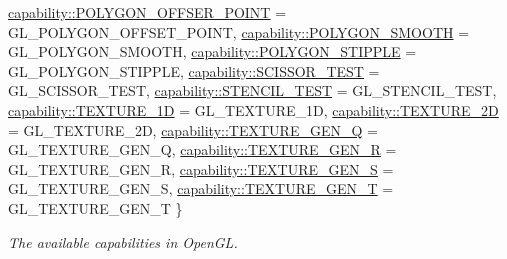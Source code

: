 \begin{DoxyCompactItemize}
\hyperlink{namespaceglpp_a1b0f7d2f17d11ae11a12d44571612832a812ddadddce589442acb4d1166558c55}{capability\+::\+P\+O\+L\+Y\+G\+O\+N\+\_\+\+O\+F\+F\+S\+E\+R\+\_\+\+P\+O\+I\+NT} = G\+L\+\_\+\+P\+O\+L\+Y\+G\+O\+N\+\_\+\+O\+F\+F\+S\+E\+T\+\_\+\+P\+O\+I\+NT, 
\hyperlink{namespaceglpp_a1b0f7d2f17d11ae11a12d44571612832ab48780489ecd89e7f6b5012516ab113e}{capability\+::\+P\+O\+L\+Y\+G\+O\+N\+\_\+\+S\+M\+O\+O\+TH} = G\+L\+\_\+\+P\+O\+L\+Y\+G\+O\+N\+\_\+\+S\+M\+O\+O\+TH, 
\hyperlink{namespaceglpp_a1b0f7d2f17d11ae11a12d44571612832ad5157f73a39d9fe47a87911957b6be34}{capability\+::\+P\+O\+L\+Y\+G\+O\+N\+\_\+\+S\+T\+I\+P\+P\+LE} = G\+L\+\_\+\+P\+O\+L\+Y\+G\+O\+N\+\_\+\+S\+T\+I\+P\+P\+LE, 
\newline
\hyperlink{namespaceglpp_a1b0f7d2f17d11ae11a12d44571612832aa527bbbc7b629e468522e5d74350c1f5}{capability\+::\+S\+C\+I\+S\+S\+O\+R\+\_\+\+T\+E\+ST} = G\+L\+\_\+\+S\+C\+I\+S\+S\+O\+R\+\_\+\+T\+E\+ST, 
\hyperlink{namespaceglpp_a1b0f7d2f17d11ae11a12d44571612832aeb0a53c0c3e59812922cab45a05ae24e}{capability\+::\+S\+T\+E\+N\+C\+I\+L\+\_\+\+T\+E\+ST} = G\+L\+\_\+\+S\+T\+E\+N\+C\+I\+L\+\_\+\+T\+E\+ST, 
\hyperlink{namespaceglpp_a1b0f7d2f17d11ae11a12d44571612832a85975f3555d8eb49414ceb23f293b0e3}{capability\+::\+T\+E\+X\+T\+U\+R\+E\+\_\+1D} = G\+L\+\_\+\+T\+E\+X\+T\+U\+R\+E\+\_\+1D, 
\hyperlink{namespaceglpp_a1b0f7d2f17d11ae11a12d44571612832acc301ce75e16247f3b96a3907519096c}{capability\+::\+T\+E\+X\+T\+U\+R\+E\+\_\+2D} = G\+L\+\_\+\+T\+E\+X\+T\+U\+R\+E\+\_\+2D, 
\newline
\hyperlink{namespaceglpp_a1b0f7d2f17d11ae11a12d44571612832a811f5a9cc14c1614ce93781ba6fc5351}{capability\+::\+T\+E\+X\+T\+U\+R\+E\+\_\+\+G\+E\+N\+\_\+Q} = G\+L\+\_\+\+T\+E\+X\+T\+U\+R\+E\+\_\+\+G\+E\+N\+\_\+Q, 
\hyperlink{namespaceglpp_a1b0f7d2f17d11ae11a12d44571612832a6a4baa3c2aafa4c5d49c63506d3b37cd}{capability\+::\+T\+E\+X\+T\+U\+R\+E\+\_\+\+G\+E\+N\+\_\+R} = G\+L\+\_\+\+T\+E\+X\+T\+U\+R\+E\+\_\+\+G\+E\+N\+\_\+R, 
\hyperlink{namespaceglpp_a1b0f7d2f17d11ae11a12d44571612832a55bb1645d6854361ba8af9ed86a76f1e}{capability\+::\+T\+E\+X\+T\+U\+R\+E\+\_\+\+G\+E\+N\+\_\+S} = G\+L\+\_\+\+T\+E\+X\+T\+U\+R\+E\+\_\+\+G\+E\+N\+\_\+S, 
\hyperlink{namespaceglpp_a1b0f7d2f17d11ae11a12d44571612832a1f4d6b8251e925998bc16afda1aa6059}{capability\+::\+T\+E\+X\+T\+U\+R\+E\+\_\+\+G\+E\+N\+\_\+T} = G\+L\+\_\+\+T\+E\+X\+T\+U\+R\+E\+\_\+\+G\+E\+N\+\_\+T
 \}\begin{DoxyCompactList}\small\item\em The available capabilities in Open\+GL. \end{DoxyCompactList}
\item 

\end{DoxyCompactItemize}
